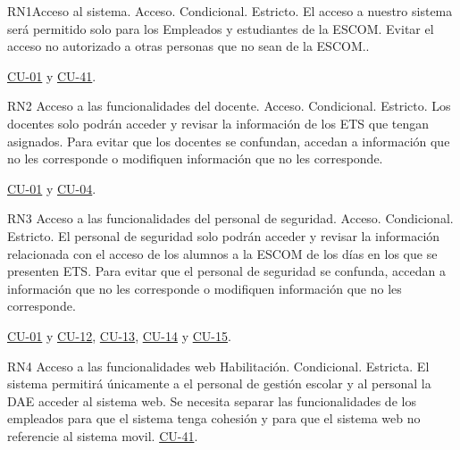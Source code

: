 \begin{BussinesRule}{RN1}{Acceso al sistema.}
	\BRitem[Tipo:] Acceso. 
	\BRitem[Clase:] Condicional. 
	\BRitem[Nivel:] Estricto.
	\BRitem[Descripción:] El acceso a nuestro sistema será permitido solo para los Empleados y estudiantes de la ESCOM.
	\BRitem[Motivación:] Evitar el acceso no autorizado a otras personas que no sean de la ESCOM..

	 \hyperlink{CU-01}{CU-01} y \hyperlink{CU41}{CU-41}.
\end{BussinesRule}

\begin{BussinesRule}{RN2}{ Acceso a las funcionalidades del docente.}
    \BRitem[Tipo:] Acceso. 
    \BRitem[Clase:] Condicional. 
    \BRitem[Nivel:] Estricto.
    \BRitem[Descripción:] Los docentes solo podrán acceder y revisar la información de los ETS que tengan asignados.
    \BRitem[Motivación:] Para evitar que los docentes se confundan, accedan a información que no les corresponde o modifiquen información que no les corresponde.

     \hyperlink{CU-01}{CU-01} y \hyperlink{CU-04}{CU-04}.
\end{BussinesRule}

\begin{BussinesRule}{RN3}{ Acceso a las funcionalidades del personal de seguridad.}
    \BRitem[Tipo:] Acceso. 
    \BRitem[Clase:] Condicional. 
    \BRitem[Nivel:] Estricto.
    \BRitem[Descripción:] El personal de seguridad solo podrán acceder y revisar la información relacionada con el acceso de los alumnos a la ESCOM de los días en los que se presenten ETS.
    \BRitem[Motivación:] Para evitar que el personal de seguridad se confunda, accedan a información que no les corresponde o modifiquen información que no les corresponde.

     \hyperlink{CU-01}{CU-01} y \hyperlink{CU-12}{CU-12}, \hyperlink{CU-13}{CU-13}, \hyperlink{CU-14}{CU-14} y \hyperlink{CU-15}{CU-15}.
\end{BussinesRule}

\begin{BussinesRule}{RN4}{ Acceso a las funcionalidades web}
	\BRitem[Tipo:] Habilitación.
	\BRitem[Clase:] Condicional.
	\BRitem[Nivel:] Estricta.
	\BRitem[Descripción:] El sistema permitirá únicamente a el personal de gestión escolar y al personal la DAE acceder al sistema web.
	\BRitem[Motivación:] Se necesita separar las funcionalidades de los empleados para que el sistema tenga cohesión y para que el sistema web no referencie al sistema movil.
	 \hyperlink{CU-41}{CU-41}.
	\end{BussinesRule}

